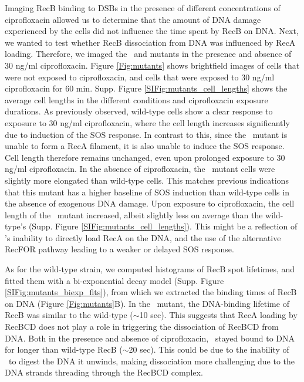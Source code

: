 Imaging RecB binding to DSBs in the presence of different concentrations of ciprofloxacin allowed us to determine that the amount of DNA damage experienced by the cells did not influence the time spent by RecB on DNA. Next, we wanted to test whether RecB dissociation from DNA was influenced by RecA loading. Therefore, we imaged the \dreca\ and \teneighty mutants in the presence and absence of 30 ng/ml ciprofloxacin. Figure \ref{Fig:mutants} shows brightfield images of cells that were not exposed to ciprofloxacin, and cells that were exposed to 30 ng/ml ciprofloxacin for 60 min. Supp. Figure \ref{SIFig:mutants_cell_lengths} shows the average cell lengths in the different conditions and ciprofloxacin exposure durations. As previously observed, wild-type cells show a clear response to exposure to 30 ng/ml ciprofloxacin, where the cell length increases significantly due to induction of the SOS response. In contrast to this, since the \dreca\ mutant is unable to form a RecA filament, it is also unable to induce the SOS response. Cell length therefore remains unchanged, even upon prolonged exposure to 30 ng/ml ciprofloxacin. In the absence of ciprofloxacin, the \teneighty\ mutant cells were slightly more elongated than wild-type cells. This matches previous indications that this mutant has a higher baseline of SOS induction than wild-type cells in the absence of exogenous DNA damage\cite{Lepore2023}. Upon exposure to ciprofloxacin, the cell length of the \teneighty\ mutant increased, albeit slightly less on average than the wild-type's (Supp. Figure \ref{SIFig:mutants_cell_lengths}). This might be a reflection of \teneighty's inability to directly load RecA on the DNA, and the use of the alternative RecFOR pathway leading to a weaker or delayed SOS response\cite{Ivancic-Bace_2003,Lepore2023}.

As for the wild-type strain, we computed histograms of RecB spot lifetimes, and fitted them with a bi-exponential decay model (Supp. Figure \ref{SIFig:mutants_biexp_fits}), from which we extracted the binding times of RecB on DNA (Figure \ref{Fig:mutants}B). In the \dreca\ mutant, the DNA-binding lifetime of RecB was similar to the wild-type ($\sim$10 sec). This suggests that RecA loading by RecBCD does not play a role in triggering the dissociation of RecBCD from DNA. Both in the presence and absence of ciprofloxacin, \teneighty\ stayed bound to DNA for longer than wild-type RecB ($\sim$20 sec). This could be due to the inability of \teneighty\ to digest the DNA it unwinds, making dissociation more challenging due to the DNA strands threading through the RecBCD complex.

